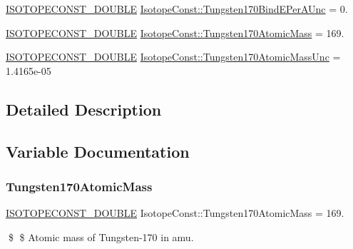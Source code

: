 \begin{DoxyCompactItemize}
\mbox{\hyperlink{group___isotope_const-_macros_ga8f45a7272ce02c0b4c65c44636ed719a}{I\+S\+O\+T\+O\+P\+E\+C\+O\+N\+S\+T\+\_\+\+D\+O\+U\+B\+LE}} \mbox{\hyperlink{group___isotope_const-_tungsten-_w170_ga096d37b4c1a100207c1bb60510e5d390}{Isotope\+Const\+::\+Tungsten170\+Bind\+E\+Per\+A\+Unc}} = 0.
\item 
\mbox{\hyperlink{group___isotope_const-_macros_ga8f45a7272ce02c0b4c65c44636ed719a}{I\+S\+O\+T\+O\+P\+E\+C\+O\+N\+S\+T\+\_\+\+D\+O\+U\+B\+LE}} \mbox{\hyperlink{group___isotope_const-_tungsten-_w170_ga6b907d2260af66ec2981634d1e7e75b4}{Isotope\+Const\+::\+Tungsten170\+Atomic\+Mass}} = 169.
\item 
\mbox{\hyperlink{group___isotope_const-_macros_ga8f45a7272ce02c0b4c65c44636ed719a}{I\+S\+O\+T\+O\+P\+E\+C\+O\+N\+S\+T\+\_\+\+D\+O\+U\+B\+LE}} \mbox{\hyperlink{group___isotope_const-_tungsten-_w170_ga6eccde8e326a8e411f908156781d7f54}{Isotope\+Const\+::\+Tungsten170\+Atomic\+Mass\+Unc}} = 1.\+4165e-\/05
\end{DoxyCompactItemize}


\subsection{Detailed Description}


\subsection{Variable Documentation}
\mbox{\label{group___isotope_const-_tungsten-_w170_ga6b907d2260af66ec2981634d1e7e75b4}} 
\subsubsection{\texorpdfstring{Tungsten170\+Atomic\+Mass}{Tungsten170AtomicMass}}
{\footnotesize\ttfamily \mbox{\hyperlink{group___isotope_const-_macros_ga8f45a7272ce02c0b4c65c44636ed719a}{I\+S\+O\+T\+O\+P\+E\+C\+O\+N\+S\+T\+\_\+\+D\+O\+U\+B\+LE}} Isotope\+Const\+::\+Tungsten170\+Atomic\+Mass = 169.}

\$ \$ Atomic mass of Tungsten-\/170 in amu. \mbox{\label{group___isotope_const-_tungsten-_w170_ga6eccde8e326a8e411f908156781d7f54}} 
